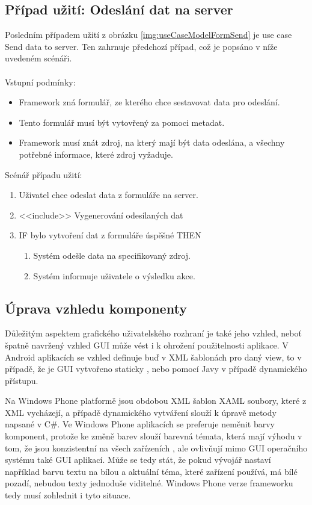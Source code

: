 \subsection{Případ užití: Odeslání dat na server}
Posledním případem užití z obrázku \ref{img:useCaseModelFormSend} je use case Send data to server. Ten zahrnuje předchozí případ, což je popsáno v níže uvedeném scénáři.\\\\
Vstupní podmínky:
\begin{itemize}
\item Framework zná formulář, ze kterého chce sestavovat data pro odeslání.
\item Tento formulář musí být vytovřený za pomoci metadat.
\item Framework musí znát zdroj, na který mají být data odeslána, a všechny potřebné informace, které zdroj vyžaduje. 
\end{itemize}
Scénář případu užití:
\begin{enumerate}
\item Uživatel chce odeslat data z formuláře na server.
\item <<include>> Vygenerování odesílaných dat
\item IF bylo vytvoření dat z formuláře úspěšné THEN	 
\begin{enumerate}
\item Systém odešle data na specifikovaný zdroj.
\item Systém informuje uživatele o výsledku akce.
\end{enumerate}
\end{enumerate}

\subsection{Úprava vzhledu komponenty}
Důležitým aspektem grafického uživatelského rozhraní je také jeho vzhled, neboť špatně navržený vzhled GUI může vést i k ohrožení použitelnosti aplikace. V Android aplikacích se vzhled definuje buď v XML šablonách pro daný view, to v případě, že je GUI vytvořeno staticky \cite{android-themes}, nebo pomocí Javy v případě dynamického přístupu. 

Na Windows Phone platformě jsou obdobou XML šablon XAML soubory, které z XML vycházejí, a případě dynamického vytváření slouží k úpravě metody napsané v C\#. Ve Windows Phone aplikacích se preferuje neměnit barvy komponent, protože ke změně barev slouží barevná témata, která mají výhodu v tom, že jsou konzistentní na všech zařízeních \cite{wp-themes}, ale ovlivňují mimo GUI operačního systému také GUI aplikací. Může se tedy stát, že pokud vývojář nastaví například barvu textu na bílou a aktuální téma, které zařízení používá, má bílé pozadí, nebudou texty jednoduše viditelné. Windows Phone verze frameworku tedy musí zohlednit i tyto situace.  

